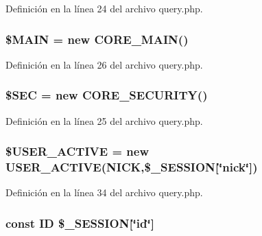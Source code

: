 Definición en la línea 24 del archivo query.\-php.

\hypertarget{query_8php_aa3efd4a61925b50d9d066bd2b42dcd3d}{
\subsubsection[{\$\-M\-A\-I\-N}]{\setlength{\rightskip}{0pt plus 5cm}\$M\-A\-I\-N = new {\bf C\-O\-R\-E\-\_\-\-M\-A\-I\-N}()}}\label{query_8php_aa3efd4a61925b50d9d066bd2b42dcd3d}


Definición en la línea 26 del archivo query.\-php.

\hypertarget{query_8php_a68aa4f40df62985576ba2fc584690b9f}{
\subsubsection[{\$\-S\-E\-C}]{\setlength{\rightskip}{0pt plus 5cm}\$S\-E\-C = new {\bf C\-O\-R\-E\-\_\-\-S\-E\-C\-U\-R\-I\-T\-Y}()}}\label{query_8php_a68aa4f40df62985576ba2fc584690b9f}


Definición en la línea 25 del archivo query.\-php.

\hypertarget{query_8php_ab0978072b4a0a336b6ca785fa4553c59}{
\subsubsection[{\$\-U\-S\-E\-R\-\_\-\-A\-C\-T\-I\-V\-E}]{\setlength{\rightskip}{0pt plus 5cm}\${\bf U\-S\-E\-R\-\_\-\-A\-C\-T\-I\-V\-E} = new {\bf U\-S\-E\-R\-\_\-\-A\-C\-T\-I\-V\-E}({\bf N\-I\-C\-K},\$\-\_\-\-S\-E\-S\-S\-I\-O\-N\mbox{[}\char`\"{}nick\char`\"{}\mbox{]})}}\label{query_8php_ab0978072b4a0a336b6ca785fa4553c59}


Definición en la línea 34 del archivo query.\-php.

\hypertarget{query_8php_a0242c89b204631bde9edc65a9a731f47}{
\subsubsection[{I\-D}]{\setlength{\rightskip}{0pt plus 5cm}const I\-D \$\-\_\-\-S\-E\-S\-S\-I\-O\-N\mbox{[}\char`\"{}id\char`\"{}\mbox{]}}}\label{query_8php_a0242c89b204631bde9edc65a9a731f47}


